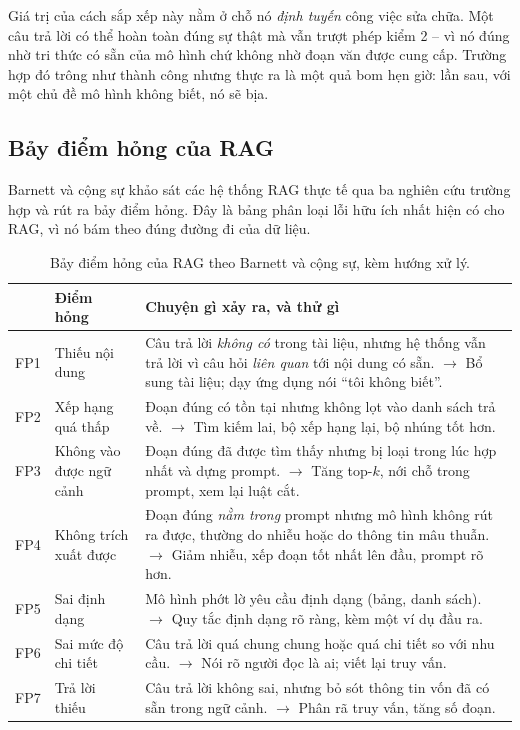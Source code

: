 \noindent Giá trị của cách sắp xếp này nằm ở chỗ nó \emph{định tuyến} công việc sửa chữa. Một câu trả lời có thể hoàn toàn đúng sự thật mà vẫn trượt phép kiểm 2 -- vì nó đúng nhờ tri thức có sẵn của mô hình chứ không nhờ đoạn văn được cung cấp. Trường hợp đó trông như thành công nhưng thực ra là một quả bom hẹn giờ: lần sau, với một chủ đề mô hình không biết, nó sẽ bịa.

\subsection{Bảy điểm hỏng của RAG}
\label{ssec:seven_failure_points}

Barnett và cộng sự \cite{barnett2024seven} khảo sát các hệ thống RAG thực tế qua ba nghiên cứu trường hợp và rút ra bảy điểm hỏng. Đây là bảng phân loại lỗi hữu ích nhất hiện có cho RAG, vì nó bám theo đúng đường đi của dữ liệu.

\begin{table}[H]
\centering
\small
\begin{tabularx}{\textwidth}{@{}llX@{}}
\toprule
& \textbf{Điểm hỏng} & \textbf{Chuyện gì xảy ra, và thử gì} \\
\midrule
FP1 & Thiếu nội dung & Câu trả lời \emph{không có} trong tài liệu, nhưng hệ thống vẫn trả lời vì câu hỏi \emph{liên quan} tới nội dung có sẵn. $\rightarrow$ Bổ sung tài liệu; dạy ứng dụng nói “tôi không biết”. \\
FP2 & Xếp hạng quá thấp & Đoạn đúng có tồn tại nhưng không lọt vào danh sách trả về. $\rightarrow$ Tìm kiếm lai, bộ xếp hạng lại, bộ nhúng tốt hơn. \\
FP3 & Không vào được ngữ cảnh & Đoạn đúng đã được tìm thấy nhưng bị loại trong lúc hợp nhất và dựng prompt. $\rightarrow$ Tăng top-$k$, nới chỗ trong prompt, xem lại luật cắt. \\
FP4 & Không trích xuất được & Đoạn đúng \emph{nằm trong} prompt nhưng mô hình không rút ra được, thường do nhiễu hoặc do thông tin mâu thuẫn. $\rightarrow$ Giảm nhiễu, xếp đoạn tốt nhất lên đầu, prompt rõ hơn. \\
FP5 & Sai định dạng & Mô hình phớt lờ yêu cầu định dạng (bảng, danh sách). $\rightarrow$ Quy tắc định dạng rõ ràng, kèm một ví dụ đầu ra. \\
FP6 & Sai mức độ chi tiết & Câu trả lời quá chung chung hoặc quá chi tiết so với nhu cầu. $\rightarrow$ Nói rõ người đọc là ai; viết lại truy vấn. \\
FP7 & Trả lời thiếu & Câu trả lời không sai, nhưng bỏ sót thông tin vốn đã có sẵn trong ngữ cảnh. $\rightarrow$ Phân rã truy vấn, tăng số đoạn. \\
\bottomrule
\end{tabularx}
\caption{Bảy điểm hỏng của RAG theo Barnett và cộng sự, kèm hướng xử lý.}
\label{tab:seven_failure_points}
\end{table}

